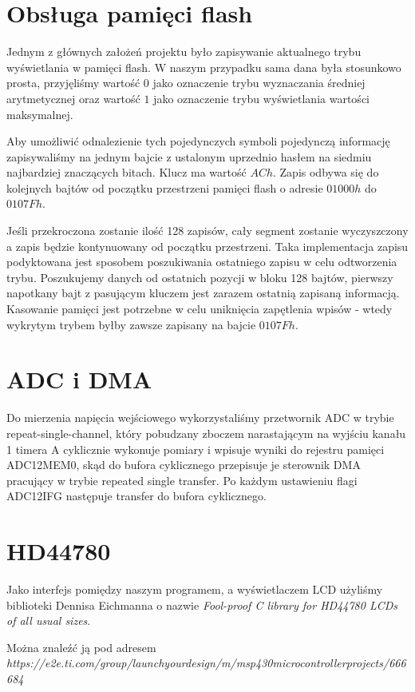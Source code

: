 \documentclass[fleqn]{article}
\begin{document}
\pagebreak
\section{Obsługa pamięci flash}
Jednym z głównych założeń projektu było zapisywanie aktualnego trybu wyświetlania w pamięci flash. W naszym przypadku sama dana była stosunkowo prosta, przyjęliśmy wartość $0$ jako oznaczenie trybu wyznaczania średniej arytmetycznej oraz wartość $1$ jako oznaczenie trybu wyświetlania wartości maksymalnej.

Aby umożliwić odnalezienie tych pojedynczych symboli pojedynczą informację zapisywaliśmy na jednym bajcie z ustalonym uprzednio hasłem na siedmiu najbardziej znaczących bitach. Klucz ma wartość $ACh$. Zapis odbywa się do kolejnych bajtów od początku przestrzeni pamięci flash o adresie $01000h$ do $0107Fh$.

Jeśli przekroczona zostanie ilość 128 zapisów, cały segment zostanie wyczyszczony a zapis będzie kontynuowany od początku przestrzeni. Taka implementacja zapisu podyktowana jest sposobem poszukiwania ostatniego zapisu w celu odtworzenia trybu. Poszukujemy danych od ostatnich pozycji w bloku 128 bajtów, pierwszy napotkany bajt z pasującym kluczem jest zarazem ostatnią zapisaną informacją. Kasowanie pamięci jest potrzebne w celu uniknięcia zapętlenia wpisów - wtedy wykrytym trybem byłby zawsze zapisany na bajcie $0107Fh$.

\section{ADC i DMA}
Do mierzenia napięcia wejściowego wykorzystaliśmy przetwornik ADC w trybie repeat-single-channel, który pobudzany zboczem narastającym na wyjściu kanału 1 timera A cyklicznie wykonuje pomiary i wpisuje wyniki do rejestru pamięci ADC12MEM0, skąd do bufora cyklicznego przepisuje je sterownik DMA pracujący w trybie repeated single transfer. Po każdym ustawieniu flagi ADC12IFG następuje transfer do bufora cyklicznego.

\section{HD44780}
Jako interfejs pomiędzy naszym programem, a wyświetlaczem LCD użyliśmy biblioteki Dennisa Eichmanna o nazwie \textit{Fool-proof C library for HD44780 LCDs of all usual sizes}.

Można znaleźć ją pod adresem \textit{https://e2e.ti.com/group/launchyourdesign/m/msp430microcontrollerprojects/666684}
\end{document}
